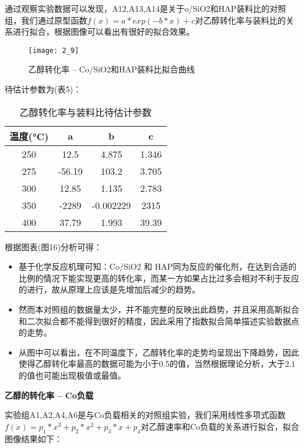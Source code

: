 \documentclass[withoutpreface,bwprint]{cumcmthesis} %
\begin{document}
通过观察实验数据可以发现，A12,A13,A14是关于o/SiO2和HAP装料比的对照组，我们通过原型函数$ f(x) = a*exp(-b*x)+c$对乙醇转化率与装料比的关系进行拟合，根据图像可以看出有很好的拟合效果。
\begin{figure}[!h]
	\centering
	\texttt{[image: 2\_9]}
	\caption{乙醇转化率 -- Co/SiO2和HAP装料比拟合曲线}
	\label{fig:circuit-diagram1}
\end{figure}
待估计参数为(表5)：
\begin{table}[!htbp]
	\caption{乙醇转化率与装料比待估计参数}\label{tab:001} \centering
	\begin{tabular}{cccc}
		\toprule[1.5pt]
		温度(°C) & a & b & c \\
		\midrule[1pt]
		250 & 12.5 &   4.875 &  1.346\\
		275 & -56.19 &   103.2 & 3.705 \\
		300 &12.85 & 1.135&  2.783 \\
		350 &-2289 &  -0.002229& 2315  \\
		400 & 37.79  &   1.993 & 39.39 \\
		\bottomrule[1.5pt]
	\end{tabular}
\end{table}
\newpage
根据图表(图16)分析可得：
\begin{itemize}
	\item 基于化学反应机理可知：Co/SiO2 和 HAP同为反应的催化剂，在达到合适的比例的情况下能实现更高的转化率，而某一方如果占比过多会相对不利于反应的进行，故从原理上应该是先增加后减少的趋势。
	\item 然而本对照组的数据量太少，并不能完整的反映出此趋势，并且采用高斯拟合和二次拟合都不能得到很好的精度，因此采用了指数拟合简单描述实验数据点的走势。
	\item 从图中可以看出，在不同温度下，乙醇转化率的走势均呈现出下降趋势，因此使得乙醇转化率最高的数据可能为小于0.5的值，当然根据理论分析，大于2.1的值也可能出现极值或最值。
\end{itemize}


\newpage
\textbf{乙醇的转化率 -- Co负载}

实验组A1,A2,A4,A6是与Co负载相关的对照组实验，我们采用线性多项式函数 $f(x) = p_1*x^3 + p_2*x^2 + p_3*x + p_4$对乙醇速率和Co负载的关系进行拟合，拟合图像结果如下：
\end{document}
